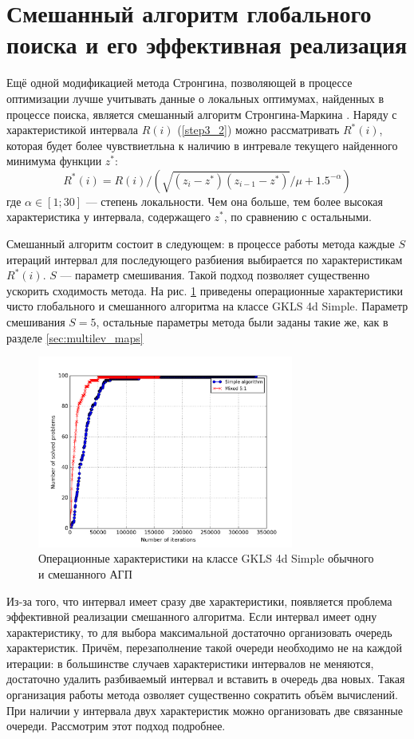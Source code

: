 \section{Смешанный алгоритм глобального поиска и его эффективная реализация}
Ещё одной модификацией метода Стронгина, позволяющей в процессе оптимизации лучше учитывать данные о локальных оптимумах, найденных в процессе поиска, является смешанный алгоритм Стронгина-Маркина \cite{mixedAlg}.
Наряду с характеристикой интервала \(R(i)\) (\ref{step3_2}) можно рассматривать \(R^*(i)\), которая будет более чувствиетльна к наличию в интревале текущего найденного минимума функции \(z^*\):
\begin{displaymath}
R^*(i)=R(i)/(\sqrt{(z_i-z^*)(z_{i-1}-z^*)}/\mu + 1.5^{-\alpha})
\end{displaymath}
где \(\alpha \in [1;30]\) --- степень локальности. Чем она больше, тем более высокая характеристика у интервала, содержащего \(z^*\), по сравнению с остальными.
\par
Смешанный алгоритм состоит в следующем: в процессе работы метода каждые \(S\) итераций интервал для последующего разбиения выбирается по характеристикам \(R^*(i)\). \(S\) --- параметр смешивания.
Такой подход позволяет существенно ускорить сходимость метода. На рис. \ref{fig:localMixOP4d} приведены операционные характеристики чисто глобального и смешанного алгоритма на классе GKLS 4d Simple.
Параметр смешивания \(S=5\), остальные параметры метода были заданы такие же, как в разделе \ref{sec:multilev_maps}
\begin{figure}[ht]
	\center
  \includegraphics[width=0.75\textwidth]{pictures/mixed_op4d.png}
  \caption{Операционные характеристики на классе GKLS 4d Simple обычного и смешанного АГП}
  \label{fig:localMixOP4d}
\end{figure}
\par
Из-за того, что интервал имеет сразу две характеристики, появляется проблема эффективной реализации смешанного алгоритма. Если интервал имеет одну характеристику, то для выбора максимальной
достаточно организовать очередь характеристик.
Причём, перезаполнение такой очереди необходимо не на каждой итерации: в большинстве случаев характеристики интервалов не меняются, достаточно удалить разбиваемый интервал и вставить в очередь два новых.
Такая организация работы метода озволяет существенно сократить объём вычислений. При наличии у интервала двух характеристик можно организовать две связанные очереди. Рассмотрим этот подход подробнее.
